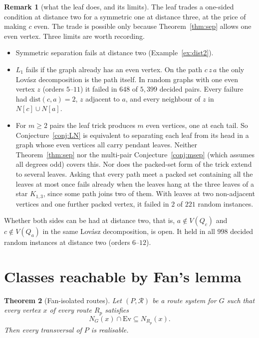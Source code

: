 \documentclass[11pt]{amsart}
\newtheorem{theorem}{Theorem}[section]
\theoremstyle{definition}
\newtheorem{remark}[theorem]{Remark}
\newcommand{\Ev}{\mathrm{Ev}}
\newcommand{\cR}{\mathcal R}
\begin{document}
\begin{remark}[what the leaf does, and its limits]\label{rem:L1res}
The leaf trades a one-sided condition at distance two for a symmetric one at distance three, at the
price of making $c$ even. The trade is possible only because Theorem~\ref{thm:sep} allows one even
vertex. Three limits are worth recording.
\begin{itemize}
\item Symmetric separation fails at distance two (Example~\ref{ex:dist2}).
\item $L_1$ fails if the graph already has an even vertex. On the path $c\,z\,a$ the only Lov\'asz
decomposition is the path itself. In random graphs with one even vertex $z$ (orders $5$--$11$) it
failed in $648$ of $5{,}399$ decided pairs. Every failure had $\mathrm{dist}(c,a)=2$, $z$ adjacent to
$a$, and every neighbour of $z$ in $N[c]\cup N[a]$.
\item For $m\ge2$ pairs the leaf trick produces $m$ even vertices, one at each tail. So
Conjecture~\ref{conj:LN} is equivalent to separating each leaf from its head in a graph whose even
vertices all carry pendant leaves. Neither Theorem~\ref{thm:sep} nor the multi-pair Conjecture~\ref{conj:msep}
(which assumes all degrees odd) covers this. Nor does the packed-set form of the trick extend to
several leaves. Asking that every path meet a packed set containing all the leaves at most once fails
already when the leaves hang at the three leaves of a star $K_{1,3}$, since some path joins two of them.
With leaves at two non-adjacent vertices and one further packed vertex, it failed in $2$ of $221$
random instances.
\end{itemize}
Whether both sides can be had at distance two, that is, $a\notin V(Q_c)$ and $c\notin V(Q_a)$ in the
same Lov\'asz decomposition, is open. It held in all $998$ decided random instances at distance two
(orders $6$--$12$).
\end{remark}

\section{Classes reachable by Fan's lemma}\label{sec:classes}

\begin{theorem}[Fan-isolated routes]\label{thm:isolated}
Let $(P,\cR)$ be a route system for $G$ such that every vertex $x$ of every route $R_p$ satisfies
\[
N_G(x)\cap\Ev\subseteq N_{R_p}(x).
\]
Then every transversal of $P$ is realisable.
\end{theorem}
\end{document}
